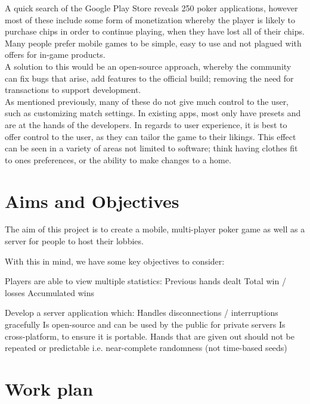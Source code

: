 \documentclass[12pt]{article}
\begin{document}
{A quick search of the Google Play Store reveals 250 poker applications, however most of these include some form of monetization whereby the player is likely to purchase chips in order to continue playing, when they have lost all of their chips. Many people prefer mobile games to be simple, easy to use and not plagued with offers for in-game products.  \\

A solution to this would be an open-source approach, whereby the community can fix bugs that arise, add features to the official build; removing the need for transactions to support development. \\ 

As mentioned previously, many of these do not give much control to the user, such as customizing match settings. In existing apps, most only have presets and are at the hands of the developers. In regards to user experience, it is best to offer control to the user, as they can tailor the game to their likings. This effect can be seen in a variety of areas not limited to software; think having clothes fit to ones preferences, or the ability to make changes to a home. %


\section*{Aims and Objectives}

The aim of this project is to create a mobile, multi-player poker game as well as a server for people to host their lobbies. 

With this in mind, we have some key objectives to consider: 

\begin{outline}


	\1 Players are able to view multiple statistics:
		\2 Previous hands dealt
		\2 Total win / losses
		\2 Accumulated wins	
	
	\1 Develop a server application which: 
		\2 Handles disconnections / interruptions gracefully
		\2 Is open-source and can be used by the public for private servers
		\2 Is cross-platform, to ensure it is portable.
	\1 Hands that are given out should not be repeated or predictable i.e. near-complete randomness (not time-based seeds)
	
	
	
\end{outline}

\newpage
\section*{Work plan}


}
\end{document}
